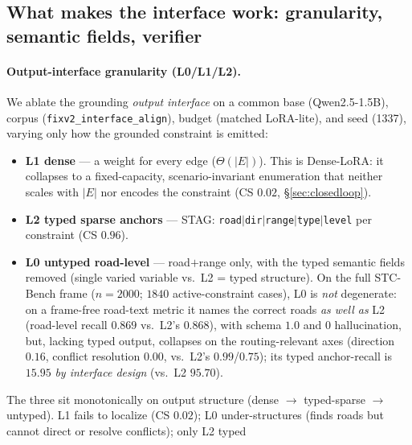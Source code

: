 \subsection{What makes the interface work: granularity, semantic fields, verifier}
\label{sec:mechanism}

\paragraph{Output-interface granularity (L0/L1/L2).}
We ablate the grounding \emph{output interface} on a common base (Qwen2.5-1.5B), corpus
(\texttt{fixv2\_interface\_align}), budget (matched LoRA-lite), and seed (1337), varying only how the
grounded constraint is emitted:
\begin{itemize}
  \item \textbf{L1 dense} — a weight for every edge ($\Theta(|E|)$). This is Dense-LoRA: it collapses to
        a fixed-capacity, scenario-invariant enumeration that neither scales with $|E|$ nor encodes the
        constraint (CS $0.02$, \S\ref{sec:closedloop}).
  \item \textbf{L2 typed sparse anchors} — STAG: \texttt{road$\mid$dir$\mid$range$\mid$type$\mid$level}
        per constraint (CS $0.96$).
  \item \textbf{L0 untyped road-level} — road$+$range only, with the typed semantic fields removed
        (single varied variable vs.\ L2 = typed structure). On the full STC-Bench frame ($n{=}2000$;
        $1840$ active-constraint cases), L0 is \emph{not} degenerate: on a frame-free road-text metric it
        names the correct roads \emph{as well as} L2 (road-level recall $0.869$ vs.\ L2's $0.868$), with
        schema $1.0$ and $0$ hallucination, but, lacking typed output, collapses on the routing-relevant
        axes (direction $0.16$, conflict resolution $0.00$, vs.\ L2's $0.99$/$0.75$); its typed
        anchor-recall is $15.95$ \emph{by interface design} (vs.\ L2 $95.70$).
\end{itemize}
The three sit monotonically on output structure (dense $\to$ typed-sparse $\to$ untyped). L1 fails to
localize (CS $0.02$); L0 under-structures (finds roads but cannot direct or resolve conflicts); only L2 typed

